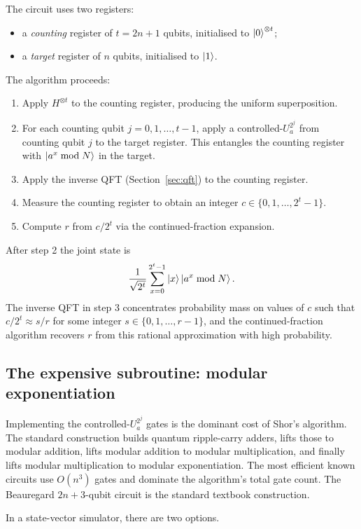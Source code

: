 The circuit uses two registers:
\begin{itemize}
\item a \emph{counting} register of $t = 2n+1$ qubits, initialised to $\mathinner{|{0}\rangle}^{\otimes t}$;
\item a \emph{target} register of $n$ qubits, initialised to $\mathinner{|{1}\rangle}$.
\end{itemize}
The algorithm proceeds:
\begin{enumerate}
\item Apply $H^{\otimes t}$ to the counting register, producing the uniform superposition.
\item For each counting qubit $j = 0,1,\ldots,t-1$, apply a controlled-$U_a^{2^j}$ from counting qubit $j$ to the target register. This entangles the counting register with $\mathinner{|{a^x \bmod N}\rangle}$ in the target.
\item Apply the inverse QFT (Section~\ref{sec:qft}) to the counting register.
\item Measure the counting register to obtain an integer $c \in \{0,1,\ldots,2^t-1\}$.
\item Compute $r$ from $c/2^t$ via the continued-fraction expansion.
\end{enumerate}
After step 2 the joint state is
\begin{equation}
\frac{1}{\sqrt{2^t}}\sum_{x=0}^{2^t - 1} \mathinner{|{x}\rangle} \mathinner{|{a^x \bmod N}\rangle}.
\end{equation}
The inverse QFT in step 3 concentrates probability mass on values of $c$ such that $c/2^t \approx s/r$ for some integer $s\in\{0,1,\ldots,r-1\}$, and the continued-fraction algorithm recovers $r$ from this rational approximation with high probability.

\subsection{The expensive subroutine: modular exponentiation}

Implementing the controlled-$U_a^{2^j}$ gates is the dominant cost of Shor's algorithm. The standard construction builds quantum ripple-carry adders, lifts those to modular addition, lifts modular addition to modular multiplication, and finally lifts modular multiplication to modular exponentiation. The most efficient known circuits use $O(n^3)$ gates and dominate the algorithm's total gate count. The Beauregard $2n+3$-qubit circuit \cite{beauregard2003} is the standard textbook construction.

In a state-vector simulator, there are two options.

